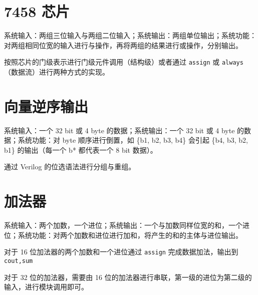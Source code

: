 \documentclass[lang=cn,11pt,a4paper,cite=authoryear]{elegantpaper}
\begin{document}
\section{7458 芯片}

系统输入：两组三位输入与两组二位输入；系统输出：两组单位输出；系统功能：对两组相同位宽的输入进行与操作，再将两组的结果进行或操作，分别输出。

按照芯片的门级表示进行门级元件调用（结构级）或者通过 \lstinline{assign} 或 \lstinline{always} （数据流）进行两种方式的实现。

\section{向量逆序输出}

系统输入：一个 32 bit 或 4 byte 的数据；系统输出：一个 32 bit 或 4 byte 的数据；系统功能：对 byte 顺序进行倒置，如 \{b1, b2, b3, b4\} 会引起 \{b4, b3, b2, b1\} 的输出（每一个 b* 都代表一个 8 bit 数据）。

通过 Verilog 的位选语法进行分组与重组。

\section{加法器}

系统输入：两个加数，一个进位；系统输出：一个与加数同样位宽的和，一个进位；系统功能：对两个加数和进位进行加和，将产生的和的主体与进位输出。

对于 16 位加法器的两个加数和一个进位通过 \lstinline{assign} 完成数据加法，输出到 \lstinline{cout,sum}

对于 32 位的加法器，需要由 16 位的加法器进行串联，第一级的进位为第二级的输入，进行模块调用即可。

\end{document}
